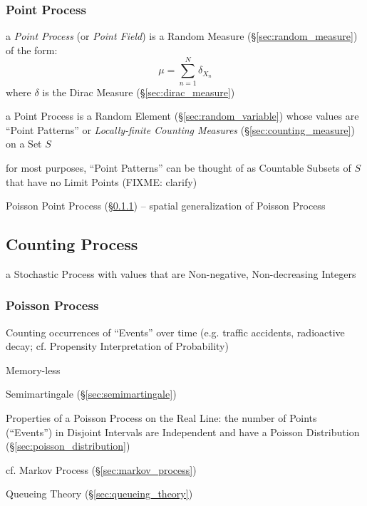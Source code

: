 \subsubsection{Point Process}\label{sec:point_process}

a \emph{Point Process} (or \emph{Point Field}) is a Random Measure
(\S\ref{sec:random_measure}) of the form:
\[
  \mu = \sum_{n=1}^N \delta_{X_n}
\]
where $\delta$ is the Dirac Measure (\S\ref{sec:dirac_measure})

a Point Process is a Random Element (\S\ref{sec:random_variable}) whose values
are ``Point Patterns'' or \emph{Locally-finite Counting Measures}
(\S\ref{sec:counting_measure}) on a Set $S$

for most purposes, ``Point Patterns'' can be thought of as Countable Subsets of
$S$ that have no Limit Points (FIXME: clarify)

Poisson Point Process (\S\ref{sec:poisson_process}) -- spatial generalization of
Poisson Process



\subsection{Counting Process}\label{sec:counting_process}

a Stochastic Process with values that are Non-negative, Non-decreasing Integers



\subsubsection{Poisson Process}\label{sec:poisson_process}

Counting occurrences of ``Events'' over time (e.g. traffic accidents,
radioactive decay; cf. Propensity Interpretation of Probability)

Memory-less

Semimartingale (\S\ref{sec:semimartingale})

Properties of a Poisson Process on the Real Line: the number of Points
(``Events'') in Disjoint Intervals are Independent and have a Poisson
Distribution (\S\ref{sec:poisson_distribution})

cf. Markov Process (\S\ref{sec:markov_process})

Queueing Theory (\S\ref{sec:queueing_theory})

